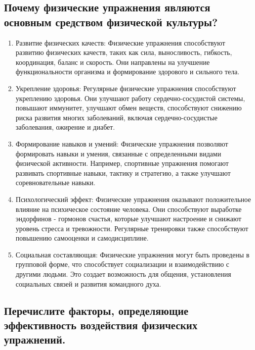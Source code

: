 \subsection{Почему физические упражнения являются основным средством физической культуры?}

\begin{enumerate}
    \item Развитие физических качеств: Физические упражнения способствуют развитию физических качеств, таких как сила, выносливость, гибкость, координация, баланс и скорость. Они направлены на улучшение функциональности организма и формирование здорового и сильного тела.
    \item Укрепление здоровья: Регулярные физические упражнения способствуют укреплению здоровья. Они улучшают работу сердечно-сосудистой системы, повышают иммунитет, улучшают обмен веществ, способствуют снижению риска развития многих заболеваний, включая сердечно-сосудистые заболевания, ожирение и диабет.
    \item Формирование навыков и умений: Физические упражнения позволяют формировать навыки и умения, связанные с определенными видами физической активности. Например, спортивные упражнения помогают развивать спортивные навыки, тактику и стратегию, а также улучшают соревновательные навыки.
    \item Психологический эффект: Физические упражнения оказывают положительное влияние на психическое состояние человека. Они способствуют выработке эндорфинов - гормонов счастья, которые улучшают настроение и снижают уровень стресса и тревожности. Регулярные тренировки также способствуют повышению самооценки и самодисциплине.
    \item Социальная составляющая: Физические упражнения могут быть проведены в групповой форме, что способствует социализации и взаимодействию с другими людьми. Это создает возможность для общения, установления социальных связей и развития командного духа.
\end{enumerate}

\subsection{Перечислите факторы, определяющие эффективность воздействия физических упражнений.}

